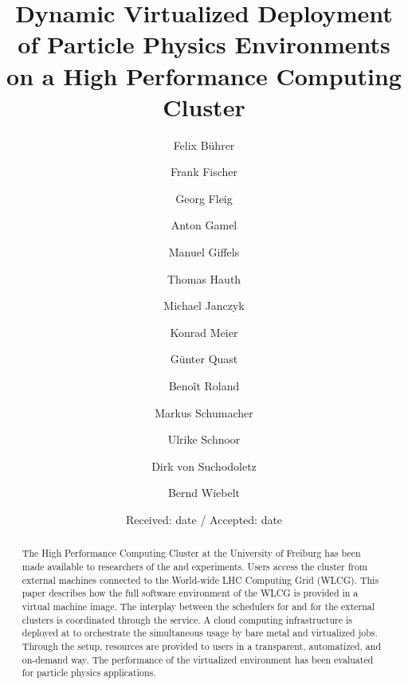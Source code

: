 %


\title{Dynamic Virtualized Deployment of Particle Physics Environments on a
  High Performance Computing Cluster}
%
\author{Felix B\"uhrer \and Frank Fischer \and Georg Fleig \and Anton
  Gamel \and Manuel Giffels \and Thomas Hauth \and Michael Janczyk
  \and Konrad Meier \and
G\"unter Quast \and  Beno\^it Roland \and
  Markus Schumacher \and Ulrike Schnoor \and Dirk von Suchodoletz \and Bernd Wiebelt
}






\date{Received: date / Accepted: date}


\maketitle

\begin{abstract}
The \NEMO High Performance Computing Cluster at the University of
Frei\-burg has been made available to
researchers of the \ATLAS and \CMS experiments.
Users access the cluster from external machines connected to the
World-wide LHC Computing Grid (WLCG).
 This paper describes how the full software environment of the WLCG
 is provided in a virtual machine image. The interplay between the
 schedulers for \NEMO and for the external
 clusters is coordinated through the \Roced service.
A cloud computing infrastructure is deployed at \NEMO to orchestrate the
simultaneous usage by bare metal and virtualized jobs.
Through the setup, resources are provided to users in a transparent,
automatized, and
on-demand way. The performance of the virtualized environment has been
evaluated for particle physics applications.



\end{abstract}




